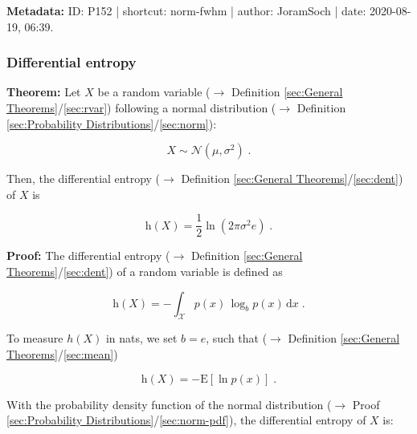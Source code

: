 \documentclass[a4paper,12pt,twoside]{book}
\begin{document}
\vspace{1em}
\textbf{Metadata:} ID: P152 | shortcut: norm-fwhm | author: JoramSoch | date: 2020-08-19, 06:39.
\vspace{1em}



\subsubsection[\textbf{Differential entropy}]{Differential entropy} \label{sec:norm-dent}
\setcounter{equation}{0}

\textbf{Theorem:} Let $X$ be a random variable ($\rightarrow$ Definition \ref{sec:General Theorems}/\ref{sec:rvar}) following a normal distribution ($\rightarrow$ Definition \ref{sec:Probability Distributions}/\ref{sec:norm}):

\begin{equation} \label{eq:norm-dent-norm}
X \sim \mathcal{N}(\mu, \sigma^2) \; .
\end{equation}

Then, the differential entropy ($\rightarrow$ Definition \ref{sec:General Theorems}/\ref{sec:dent}) of $X$ is

\begin{equation} \label{eq:norm-dent-norm-dent}
\mathrm{h}(X) = \frac{1}{2} \ln\left( 2 \pi \sigma^2 e \right) \; .
\end{equation}

\vspace{1em}
\textbf{Proof:} The differential entropy ($\rightarrow$ Definition \ref{sec:General Theorems}/\ref{sec:dent}) of a random variable is defined as

\begin{equation} \label{eq:norm-dent-dent}
\mathrm{h}(X) = - \int_{\mathcal{X}} p(x) \, \log_b p(x) \, \mathrm{d}x \; .
\end{equation}

To measure $h(X)$ in nats, we set $b = e$, such that ($\rightarrow$ Definition \ref{sec:General Theorems}/\ref{sec:mean})

\begin{equation} \label{eq:norm-dent-dent-nats}
\mathrm{h}(X) = - \mathrm{E}\left[ \ln p(x) \right] \; .
\end{equation}

With the probability density function of the normal distribution ($\rightarrow$ Proof \ref{sec:Probability Distributions}/\ref{sec:norm-pdf}), the differential entropy of $X$ is:
\end{document}
